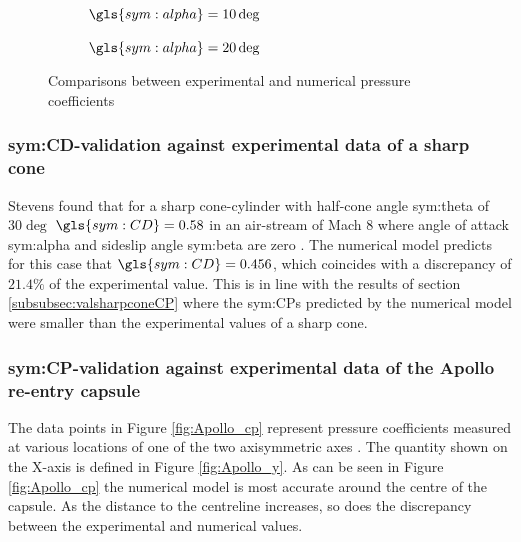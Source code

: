 \begin{figure}[h]
	\centering
	\begin{subfigure}[b]{0.49\textwidth}
		\centering
		\setlength{} 
		\setlength{}
		
		\caption{$\gls{sym:alpha}=10\deg$}
		\label{fig:CPconealpha10}
	\end{subfigure}
		\begin{subfigure}[b]{0.49\textwidth}
			\centering
			\setlength{} 
			\setlength{}
			
		\caption{$\gls{sym:alpha}=20\deg$}
		\label{fig:CPconealpha20}
	\end{subfigure}
	\caption{Comparisons between experimental and numerical pressure coefficients}
	\label{fig:CPcone30val}
\end{figure}

\subsubsection{\gls{sym:CD}-validation against experimental data of a sharp cone}
\label{subsubsec:valsharpconeCD}
Stevens found that for a sharp cone-cylinder with half-cone angle \gls{sym:theta} of $30\deg$ $\gls{sym:CD}=0.58$ in an air-stream of Mach $8$ where angle of attack \gls{sym:alpha} and sideslip angle \gls{sym:beta} are zero \cite{Stevens1950,AndersonJr.2007}. The numerical model predicts for this case that $\gls{sym:CD}=0.456$, which coincides with a discrepancy of $21.4\%$ of the experimental value. This is in line with the results of section \ref{subsubsec:valsharpconeCP} where the \glspl{sym:CP} predicted by the numerical model were smaller than the experimental values of a sharp cone.

\subsubsection{\gls{sym:CP}-validation against experimental data of the Apollo re-entry capsule}
\label{subsubsec:Apollo_validation}
The data points in Figure \ref{fig:Apollo_cp} represent pressure coefficients measured at various locations of one of the two axisymmetric axes \cite{Bertin1966}. The quantity shown on the X-axis is defined in Figure \ref{fig:Apollo_y}. As can be seen in Figure \ref{fig:Apollo_cp} the numerical model is most accurate around the centre of the capsule. As the distance to the centreline increases, so does the discrepancy between the experimental and numerical values.

